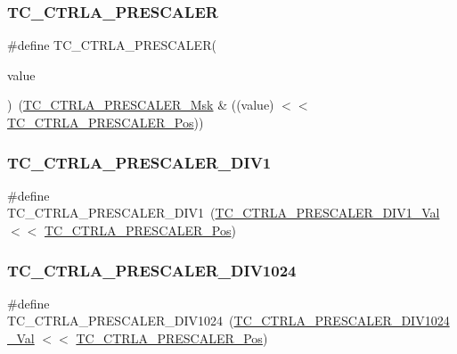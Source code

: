 \subsubsection{\texorpdfstring{TC\_CTRLA\_PRESCALER}{TC\_CTRLA\_PRESCALER}}
{\footnotesize\ttfamily \#define T\+C\+\_\+\+C\+T\+R\+L\+A\+\_\+\+P\+R\+E\+S\+C\+A\+L\+ER(\begin{DoxyParamCaption}\item[{}]{value }\end{DoxyParamCaption})~(\mbox{\hyperlink{group___s_a_m_d21___t_c_gad63c64ce39329e49a101ba680ed3a954}{T\+C\+\_\+\+C\+T\+R\+L\+A\+\_\+\+P\+R\+E\+S\+C\+A\+L\+E\+R\+\_\+\+Msk}} \& ((value) $<$$<$ \mbox{\hyperlink{group___s_a_m_d21___t_c_ga99d3a0239aaa0aecd6d8bec41fd4ce05}{T\+C\+\_\+\+C\+T\+R\+L\+A\+\_\+\+P\+R\+E\+S\+C\+A\+L\+E\+R\+\_\+\+Pos}}))}

\mbox{\label{group___s_a_m_d21___t_c_ga2a2bb6e8ae99204d0df8521c97018a1d}} 
\subsubsection{\texorpdfstring{TC\_CTRLA\_PRESCALER\_DIV1}{TC\_CTRLA\_PRESCALER\_DIV1}}
{\footnotesize\ttfamily \#define T\+C\+\_\+\+C\+T\+R\+L\+A\+\_\+\+P\+R\+E\+S\+C\+A\+L\+E\+R\+\_\+\+D\+I\+V1~(\mbox{\hyperlink{group___s_a_m_d21___t_c_ga28845569709fb65583d42d7d6f75b2e5}{T\+C\+\_\+\+C\+T\+R\+L\+A\+\_\+\+P\+R\+E\+S\+C\+A\+L\+E\+R\+\_\+\+D\+I\+V1\+\_\+\+Val}}   $<$$<$ \mbox{\hyperlink{group___s_a_m_d21___t_c_ga99d3a0239aaa0aecd6d8bec41fd4ce05}{T\+C\+\_\+\+C\+T\+R\+L\+A\+\_\+\+P\+R\+E\+S\+C\+A\+L\+E\+R\+\_\+\+Pos}})}

\mbox{\label{group___s_a_m_d21___t_c_ga64129a9b91628fd9ae8da421e9a5ba46}} 
\subsubsection{\texorpdfstring{TC\_CTRLA\_PRESCALER\_DIV1024}{TC\_CTRLA\_PRESCALER\_DIV1024}}
{\footnotesize\ttfamily \#define T\+C\+\_\+\+C\+T\+R\+L\+A\+\_\+\+P\+R\+E\+S\+C\+A\+L\+E\+R\+\_\+\+D\+I\+V1024~(\mbox{\hyperlink{group___s_a_m_d21___t_c_ga4bf804edc81bb01e9fc5cc9c7b365d86}{T\+C\+\_\+\+C\+T\+R\+L\+A\+\_\+\+P\+R\+E\+S\+C\+A\+L\+E\+R\+\_\+\+D\+I\+V1024\+\_\+\+Val}} $<$$<$ \mbox{\hyperlink{group___s_a_m_d21___t_c_ga99d3a0239aaa0aecd6d8bec41fd4ce05}{T\+C\+\_\+\+C\+T\+R\+L\+A\+\_\+\+P\+R\+E\+S\+C\+A\+L\+E\+R\+\_\+\+Pos}})}

